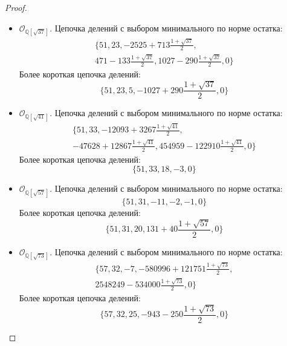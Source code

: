 \documentclass[_00_dissertation.tex]{subfiles}
\begin{document}
\begin{proof}
\begin{itemize}
        \item $\mathcal{O}_{\mathbb{Q}[\sqrt{37}]}$.
        Цепочка делений с выбором минимального по норме остатка:
        \begin{multline*}
            \{51, 23, -2525+713\frac{1+\sqrt{37}}{2},\\
            471-133\frac{1+\sqrt{37}}{2}, 1027-290\frac{1+\sqrt{37}}{2}, 0\}
        \end{multline*}
        Более короткая цепочка делений:
        \begin{equation*}
            \{51, 23, 5, -1027+290\frac{1+\sqrt{37}}{2}, 0\}
        \end{equation*}

        \item $\mathcal{O}_{\mathbb{Q}[\sqrt{41}]}$.
        Цепочка делений с выбором минимального по норме остатка:
        \begin{multline*}
            \{51, 33, -12093+3267\frac{1+\sqrt{41}}{2},\\
            -47628+12867\frac{1+\sqrt{41}}{2}, 454959-122910\frac{1+\sqrt{41}}{2}, 0\}
        \end{multline*}
        Более короткая цепочка делений:
        \begin{equation*}
            \{51, 33, 18, -3, 0\}
        \end{equation*}

        \item $\mathcal{O}_{\mathbb{Q}[\sqrt{57}]}$.
        Цепочка делений с выбором минимального по норме остатка:
        \begin{equation*}
            \{51, 31, -11, -2, -1, 0\}
        \end{equation*}
        Более короткая цепочка делений:
        \begin{equation*}
            \{51, 31, 20, 131+40\frac{1+\sqrt{57}}{2}, 0\}
        \end{equation*}

        \item $\mathcal{O}_{\mathbb{Q}[\sqrt{73}]}$.
        Цепочка делений с выбором минимального по норме остатка:
        \begin{multline*}
            \{57, 32, -7, -580996+121751\frac{1+\sqrt{73}}{2},\\
            2548249-534000\frac{1+\sqrt{73}}{2}, 0\}
        \end{multline*}
        Более короткая цепочка делений:
        \begin{equation*}
            \{57, 32, 25, -943-250\frac{1+\sqrt{73}}{2}, 0\}
        \end{equation*}
    \end{itemize}
\end{proof}
\end{document}
